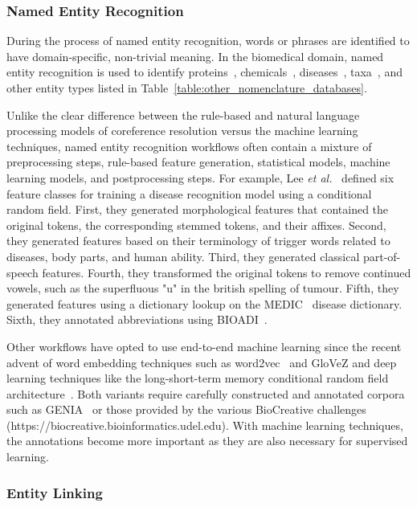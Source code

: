 \subsubsection*{Named Entity Recognition}

During the process of named entity recognition, words or phrases are identified to have domain-specific, non-trivial meaning.
In the biomedical domain, named entity recognition is used to identify proteins~\cite{Hsu2008,Leaman2008, Hakenberg2011,Wei2015}, chemicals~\cite{Leaman2015,Corbett2018,Giorgi526244}, diseases~\cite{Leaman2013,Giorgi526244}, taxa~\cite{Gerner2010,Wei2012}, and other entity types listed in Table~\ref{table:other_nomenclature_databases}.

Unlike the clear difference between the rule-based and natural language processing models of coreference resolution versus the machine learning techniques, named entity recognition workflows often contain a mixture of preprocessing steps, rule-based feature generation, statistical models, machine learning models, and postprocessing steps.
For example, Lee \textit{et al.}~\cite{Lee2015} defined six feature classes for training a disease recognition model using a conditional random field.
First, they generated morphological features that contained the original tokens, the corresponding stemmed tokens, and their affixes.
Second, they generated features based on their terminology of trigger words related to diseases, body parts, and human ability.
Third, they generated classical part-of-speech features.
Fourth, they transformed the original tokens to remove continued vowels, such as the superfluous "u" in the british spelling of tumour.
Fifth, they generated features using a dictionary lookup on the MEDIC~\cite{Davis2012} disease dictionary.
Sixth, they annotated abbreviations using BIOADI~\cite{Kuo2009}.

Other workflows have opted to use end-to-end machine learning since the recent advent of word embedding techniques such as word2vec~\cite{Mikolov2013} and GloVeZ\cite{Pennington2014} and deep learning techniques like the long-short-term memory conditional random field architecture~\cite{Lample2016}.
Both variants require carefully constructed and annotated corpora such as GENIA~\cite{Kim2003} or those provided by the various BioCreative challenges (https://biocreative.bioinformatics.udel.edu).
With machine learning techniques, the annotations become more important as they are also necessary for supervised learning.


\subsubsection*{Entity Linking}

